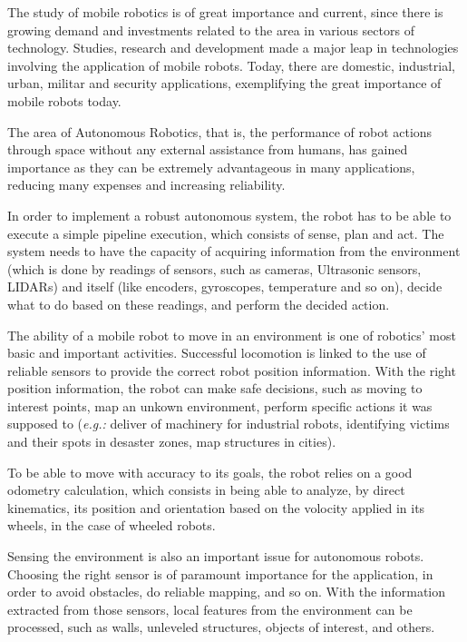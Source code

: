 \documentclass[twoside,conference,a4paper]{IEEEtran}
\begin{document}
The study of mobile robotics is of great importance and current, since there is growing demand and investments related to the area in various sectors of technology\cite{siegwart2011introduction}.
Studies, research and development made a major leap in technologies involving the application of mobile robots. Today, there are domestic, industrial, urban, militar and security applications, exemplifying the great importance of mobile robots today.
\par
The area of Autonomous Robotics, that is, the performance of robot actions through space without any external assistance from humans, has gained importance as they can be extremely advantageous in many applications, reducing many expenses and increasing reliability.
\par
In order to implement a robust autonomous system, the robot has to be able to execute a simple pipeline execution, which consists of sense, plan and act. The system needs to have the capacity of acquiring information from the environment (which is done by readings of sensors, such as cameras, Ultrasonic sensors, LIDARs) and itself (like encoders, gyroscopes\cite{Gyroscope}, temperature and so on), decide what to do based on these readings, and perform the decided action.
\par
The ability of a mobile robot to move in an environment is one of robotics' most basic and important activities. Successful locomotion is linked to the use of reliable sensors to provide the correct robot position information. With the right position information, the robot can make safe decisions, such as moving to interest points, map an unkown environment, perform specific actions it was supposed to (\textit{e.g.:} deliver of machinery for industrial robots, identifying victims and their spots in desaster zones, map structures in cities).
\par
To be able to move with accuracy to its goals, the robot relies on a good odometry\cite{estherclasses} calculation, which consists in being able to analyze, by direct kinematics, its position and orientation based on the volocity applied in its wheels, in the case of wheeled robots. 
\par
Sensing the environment is also an important issue for autonomous robots. Choosing the right sensor is of paramount importance for the application, in order to avoid obstacles, do reliable mapping, and so on. With the information extracted from those sensors, local features from the environment can be processed, such as walls, unleveled structures, objects of interest, and others. 
\end{document}

